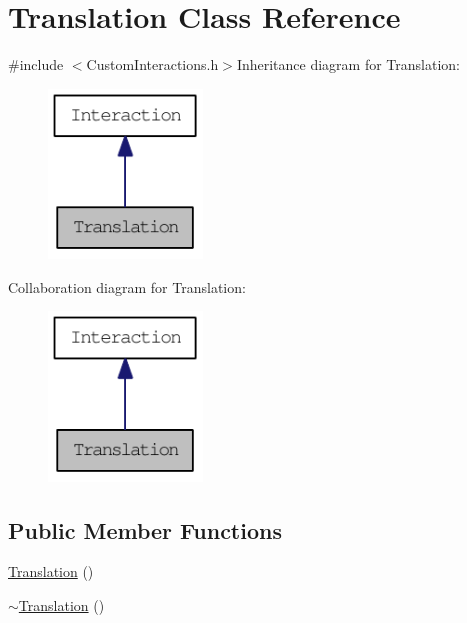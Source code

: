 \hypertarget{classTranslation}{
\section{Translation Class Reference}
\label{classTranslation}
}


{\ttfamily \#include $<$CustomInteractions.h$>$}Inheritance diagram for Translation:\nopagebreak
\begin{figure}[H]
\begin{center}
\leavevmode
\includegraphics[width=116pt]{classTranslation__inherit__graph}
\end{center}
\end{figure}
Collaboration diagram for Translation:\nopagebreak
\begin{figure}[H]
\begin{center}
\leavevmode
\includegraphics[width=116pt]{classTranslation__coll__graph}
\end{center}
\end{figure}
\subsection*{Public Member Functions}
\begin{DoxyCompactItemize}
\item 
\hyperlink{classTranslation_a19a6742a807888b66b0a402469bbf588}{Translation} ()
\item 
\hyperlink{classTranslation_ab6843356b4ba3234408b6a6024f0a5f1}{$\sim$Translation} ()
\end{DoxyCompactItemize}


